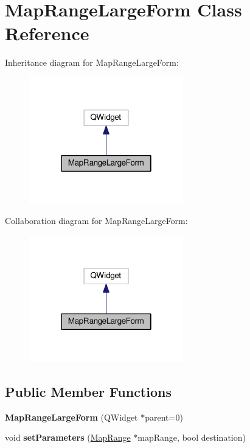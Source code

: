 \hypertarget{class_map_range_large_form}{}\section{Map\+Range\+Large\+Form Class Reference}
\label{class_map_range_large_form}


Inheritance diagram for Map\+Range\+Large\+Form\+:
\nopagebreak
\begin{figure}[H]
\begin{center}
\leavevmode
\includegraphics[width=190pt]{class_map_range_large_form__inherit__graph}
\end{center}
\end{figure}


Collaboration diagram for Map\+Range\+Large\+Form\+:
\nopagebreak
\begin{figure}[H]
\begin{center}
\leavevmode
\includegraphics[width=190pt]{class_map_range_large_form__coll__graph}
\end{center}
\end{figure}
\subsection*{Public Member Functions}
\begin{DoxyCompactItemize}
\item 
{\bfseries Map\+Range\+Large\+Form} (Q\+Widget $\ast$parent=0)\hypertarget{class_map_range_large_form_aa53b4a44a7f53641d7d0bc349c64344e}{}\label{class_map_range_large_form_aa53b4a44a7f53641d7d0bc349c64344e}

\item 
void {\bfseries set\+Parameters} (\hyperlink{class_map_range}{Map\+Range} $\ast$map\+Range, bool destination)\hypertarget{class_map_range_large_form_a121c4416e9cd758bc0258b5e9e855917}{}\label{class_map_range_large_form_a121c4416e9cd758bc0258b5e9e855917}

\end{DoxyCompactItemize}


